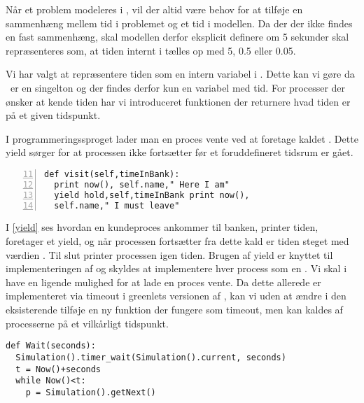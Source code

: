 Når et problem modeleres i \des, vil der altid være behov for at
tilføje en sammenhæng mellem tid i problemet og et tid i modellen. Da
der der ikke findes en fast sammenhæng, skal modellen derfor eksplicit
definere om 5 sekunder skal repræsenteres som, at tiden internt i
\pycsp tælles op med 5, 0.5 eller 0.05.

Vi har valgt at repræsentere tiden som en intern variabel i \sched.
Dette kan vi gøre da \sched ~er en singelton og der findes derfor kun
en variabel med tid. For processer der ønsker at kende tiden har vi
introduceret funktionen  der returnere hvad tiden er på et
given tidspunkt.


I programmeringssproget \simpy lader man en proces vente ved at
foretage kaldet . Dette yield sørger for at processen ikke
fortsætter før et foruddefineret tidsrum er gået.

\begin{lstlisting}[firstnumber=11 , stepnumber=2, numbers=left,float=hbtp, label=yield, caption= Et yield i \simpy (Taget fra Bank05.py i eksemplet fra \simpy)] 
def visit(self,timeInBank): 
  print now(), self.name," Here I am" 
  yield hold,self,timeInBank print now(),
  self.name," I must leave" 
\end{lstlisting}

I \cref{yield} ses hvordan en kundeproces ankommer til banken,
printer tiden, foretager et yield, og når processen fortsætter
fra dette kald er tiden steget med værdien .
Til slut printer processen igen tiden. Brugen af yield er knyttet
til implementeringen af \simpy og skyldes at \simpy implementere
hver process som en . Vi skal i \pycsp have en
ligende mulighed for at lade en proces vente. Da dette allerede er
implementeret via timeout i greenlets versionen af \pycsp, kan vi
uden at ændre i den eksisterende \sched tilføje en ny funktion
 der fungere som timeout, men kan kaldes af processerne
på et vilkårligt tidspunkt. 

\begin{lstlisting}[firstnumber=20,float=hbtp, label=wait, caption=Wait i simuleringsversionen.] 
def Wait(seconds): 
  Simulation().timer_wait(Simulation().current, seconds) 
  t = Now()+seconds
  while Now()<t: 
    p = Simulation().getNext() 
\end{lstlisting}

